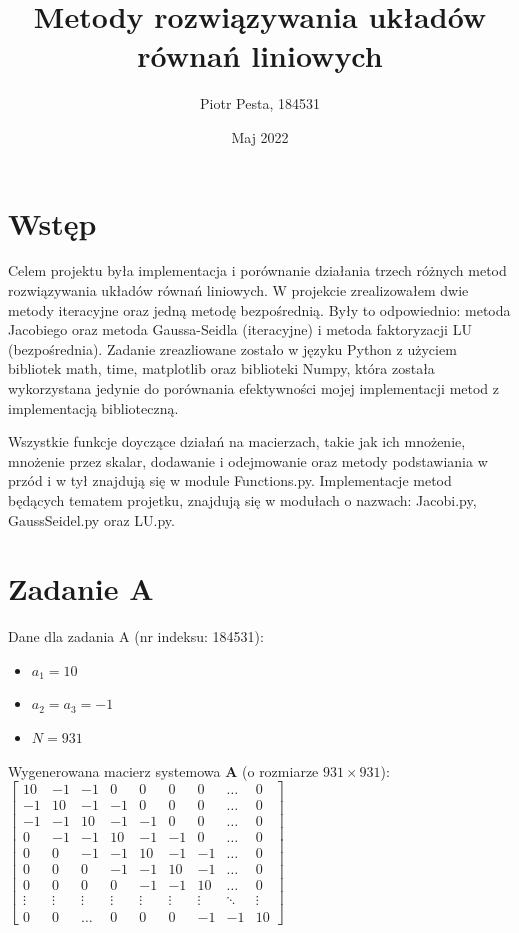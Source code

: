 \documentclass[fleqn]{article}
\title{Metody rozwiązywania układów równań liniowych}
\author{Piotr Pesta, 184531}
\date{Maj 2022}
\begin{document}
    \maketitle

    \section{Wstęp}
    Celem projektu była implementacja i porównanie działania trzech różnych metod rozwiązywania układów równań liniowych. 
    W projekcie zrealizowałem dwie metody iteracyjne oraz jedną metodę bezpośrednią.
    Były to odpowiednio: metoda Jacobiego oraz metoda Gaussa-Seidla (iteracyjne) i metoda faktoryzacji LU (bezpośrednia).
    Zadanie zreazliowane zostało w języku Python z użyciem bibliotek math, time, matplotlib oraz biblioteki Numpy, 
    która została wykorzystana jedynie do porównania efektywności mojej implementacji metod z implementacją biblioteczną.

    Wszystkie funkcje doyczące działań na macierzach, takie jak ich mnożenie, mnożenie przez skalar, dodawanie
    i odejmowanie oraz metody podstawiania w przód i w tył znajdują się w module Functions.py. Implementacje metod będących tematem
    projetku, znajdują się w modułach o nazwach: Jacobi.py, GaussSeidel.py oraz LU.py.

    \section{Zadanie A}
    Dane dla zadania A (nr indeksu: 184531):
    \begin{itemize}
        \item $a_1 = 10$ 
        \item $a_2 = a_3 = -1$
        \item $N = 931$
    \end{itemize}
    \noindent Wygenerowana macierz systemowa \textbf{A} (o rozmiarze $931 \times 931$): \\

    $\begin{bmatrix}
    10 & -1 & -1 & 0 & 0 & 0 & 0 & \ldots & 0 \\
    -1 & 10 & -1 & -1 & 0 & 0 & 0 & \ldots & 0 \\
    -1 & -1 & 10 & -1 & -1 & 0 & 0 & \ldots & 0 \\
    0 & -1 & -1 & 10 & -1 & -1 & 0 & \ldots & 0 \\
    0 & 0 & -1 & -1 & 10 & -1 & -1 & \ldots & 0 \\
    0 & 0 & 0 & -1 & -1 & 10 & -1 & \ldots & 0 \\
    0 & 0 & 0 & 0 & -1 & -1 & 10 & \ldots & 0 \\
    \vdots & \vdots & \vdots & \vdots & \vdots & \vdots & \vdots & \ddots & \vdots \\
    0 & 0 & \ldots & 0 & 0 & 0 & -1 & -1 & 10
    \end{bmatrix}$
    \\ 
\end{document}
